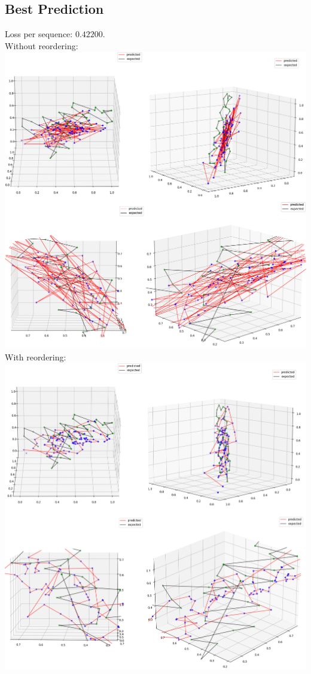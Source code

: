 \documentclass[11pt]{article}
\newcommand{\np}{\newpage}
\begin{document}
\subsection{Best Prediction}
Loss per sequence: $0.42200$.\\[3mm]
Without reordering:\\[2mm]
\includegraphics[scale=0.42]{best1.png}\np
With reordering:\\[2mm]
\includegraphics[scale=0.42]{best2.png}\np
\end{document}
